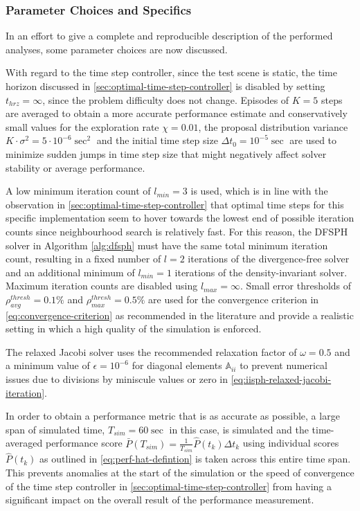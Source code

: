 \documentclass[oneside, a4paper]{book}
\begin{document}
  \subsubsection{Parameter Choices and Specifics}
  In an effort to give a complete and reproducible description of the performed analyses, some parameter choices are now discussed. 
  
  With regard to the time step controller, since the test scene is static, the time horizon discussed in \autoref{sec:optimal-time-step-controller} is disabled by setting $t_{hrz}=\infty$, since the problem difficulty does not change. Episodes of $K=5$ steps are averaged to obtain a more accurate performance estimate and conservatively small values for the exploration rate $\chi=0.01$, the proposal distribution variance $K\cdot \sigma^2=5\cdot 10^{-6}\sec^2$ and the initial time step size $\Delta t_0 = 10^{-5}\sec$ are used to minimize sudden jumps in time step size that might negatively affect solver stability or average performance.

  A low minimum iteration count of $l_{min}=3$ is used, which is in line with the observation in \autoref{sec:optimal-time-step-controller} that optimal time steps for this specific implementation seem to hover towards the lowest end of possible iteration counts since neighbourhood search is relatively fast. For this reason, the DFSPH solver in Algorithm \ref{alg:dfsph} must have the same total minimum iteration count, resulting in a fixed number of $l=2$ iterations of the divergence-free solver and an additional minimum of $l_{min}=1$ iterations of the density-invariant solver. Maximum iteration counts are disabled using $l_{max}=\infty$. Small error thresholds of $\rho_{avg}^{thresh}=0.1\% $\autocite{iisph} and $\rho_{max}^{thresh}=0.5\%$ are used for the convergence criterion in \autoref{eq:convergence-criterion} as recommended in the literature and provide a realistic setting in which a high quality of the simulation is enforced. 

  The relaxed Jacobi solver uses the recommended \autocite{iisph} relaxation factor of $\omega=0.5$ and a minimum value of $\epsilon=10^{-6}$ for diagonal elements $\mathds{A}_{ii}$ to prevent numerical issues due to divisions by miniscule values or zero in \autoref{eq:iisph-relaxed-jacobi-iteration}.

  In order to obtain a performance metric that is as accurate as possible, a large span of simulated time, $T_{sim}=60\sec$ in this case, is simulated and the time-averaged performance score $\bar{P}(T_{sim}) = \frac{1}{T_{sim}} \hat{P}(t_k)\Delta t_k$ using individual scores $\hat{P}(t_k)$ as outlined in \autoref{eq:perf-hat-defintion} is taken across this entire time span. This prevents anomalies at the start of the simulation or the speed of convergence of the time step controller in \autoref{sec:optimal-time-step-controller} from having a significant impact on the overall result of the performance measurement.
\end{document}
